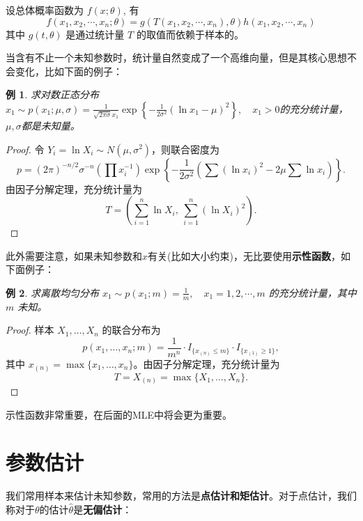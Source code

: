 \documentclass[a4paper]{ctexart}
\newtheorem{example}{例}[section]
\begin{document}
设总体概率函数为 \(f(x;\theta)\), 有
\begin{equation}
    f(x_1, x_2, \cdots, x_n; \theta) = g(T(x_1, x_2, \cdots, x_n), \theta) h(x_1, x_2, \cdots, x_n)
\end{equation}
其中 \(g(t,\theta)\) 是通过统计量 \(T\) 的取值而依赖于样本的。
\begin{tipbox}
    当含有不止一个未知参数时，统计量自然变成了一个高维向量，但是其核心思想不会变化，比如下面的例子：
    \begin{example}
        求对数正态分布 \(x_1 \sim p(x_1; \mu, \sigma) = \frac{1}{\sqrt{2\pi\sigma} x_1} \exp\left\{-\frac{1}{2\sigma^2}(\ln x_1 - \mu)^2\right\},\quad x_1 > 0\)的充分统计量，$\mu,\sigma$都是未知量。
    \end{example}
    \begin{proof}
        令 \(Y_i = \ln X_i \sim N(\mu, \sigma^2)\)，则联合密度为
        \[
        p = (2\pi)^{-n/2}\sigma^{-n}\left(\prod x_i^{-1}\right)\exp\left\{-\frac{1}{2\sigma^2}\left(\sum (\ln x_i)^2 - 2\mu\sum \ln x_i\right)\right\}.
        \]
        由因子分解定理，充分统计量为
        \[
        \boxed{T = \left(\sum_{i=1}^n \ln X_i,\ \sum_{i=1}^n (\ln X_i)^2\right)}.
        \]
    \end{proof}
    此外需要注意，如果未知参数和$x$有关(比如大小约束)，无比要使用\textbf{示性函数}，如下面例子：
    \begin{example}
        求离散均匀分布 \(x_1 \sim p(x_1; m) = \frac{1}{m},\quad x_1 = 1, 2, \cdots, m\) 的充分统计量，其中 \(m\) 未知。
    \end{example}
    \begin{proof}
        样本 \(X_1, \ldots, X_n\) 的联合分布为
        \[
        p(x_1, \ldots, x_n; m) = \frac{1}{m^n} \cdot I_{\{x_{(n)} \le m\}} \cdot I_{\{x_{(1)} \ge 1\}},
        \]
        其中 \(x_{(n)} = \max\{x_1, \ldots, x_n\}\)。由因子分解定理，充分统计量为
        \[
        \boxed{T = X_{(n)} = \max\{X_1, \ldots, X_n\}}.
        \]
    \end{proof}
    示性函数非常重要，在后面的MLE中将会更为重要。
\end{tipbox}

\section{参数估计}
我们常用样本来估计未知参数，常用的方法是\textbf{点估计和矩估计}。对于点估计，我们称对于$\theta$的估计$\hat{\theta}$是\textbf{无偏估计}：
\end{document}
